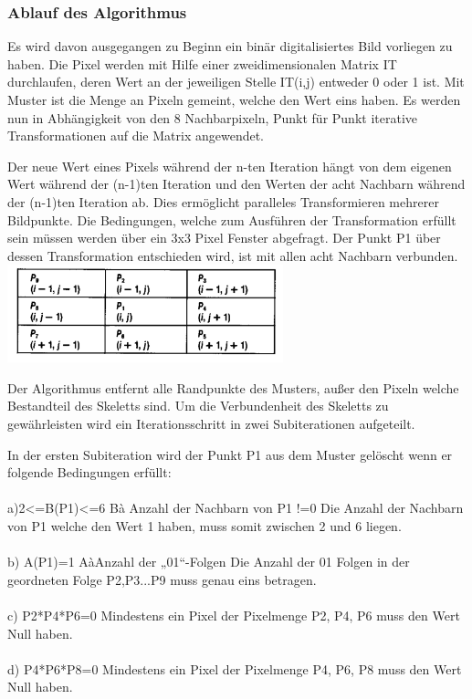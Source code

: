 \subsubsection{Ablauf des Algorithmus}

Es wird davon ausgegangen zu Beginn ein binär digitalisiertes Bild vorliegen zu haben.
Die Pixel werden mit Hilfe einer zweidimensionalen Matrix IT durchlaufen, deren Wert an der jeweiligen Stelle IT(i,j) entweder 0 oder 1 ist.
Mit Muster ist die Menge an Pixeln gemeint, welche den Wert eins haben.
Es werden nun in Abhängigkeit von den 8 Nachbarpixeln, Punkt für Punkt iterative Transformationen auf die Matrix angewendet.

Der neue Wert eines Pixels während der n-ten Iteration hängt von dem eigenen Wert während der (n-1)ten Iteration und den Werten der acht Nachbarn während der (n-1)ten Iteration ab. Dies ermöglicht paralleles Transformieren mehrerer Bildpunkte. 
Die Bedingungen, welche zum Ausführen der Transformation erfüllt sein müssen werden über ein 3x3 Pixel Fenster abgefragt. Der Punkt P1 über dessen Transformation entschieden wird, ist mit allen acht Nachbarn verbunden.\\

\includegraphics[width=8cm]{Res/PixelNachbarschaft.png}


Der Algorithmus entfernt alle Randpunkte des Musters, außer den Pixeln welche Bestandteil des Skeletts sind. Um die Verbundenheit des Skeletts zu gewährleisten wird ein  Iterationsschritt in zwei Subiterationen aufgeteilt.

In der ersten Subiteration wird der Punkt P1 aus dem Muster gelöscht wenn er folgende Bedingungen erfüllt:\\ \\
a)2<=B(P1)<=6     
Bà Anzahl der Nachbarn von P1 !=0
Die Anzahl der Nachbarn von P1 welche den Wert 1 haben, muss somit zwischen 2 und 6 liegen.\\ \\
b) A(P1)=1
AàAnzahl der „01“-Folgen 
Die Anzahl der 01 Folgen in der geordneten Folge P2,P3...P9 muss genau eins betragen.\\ \\
c) P2*P4*P6=0  
Mindestens ein Pixel der Pixelmenge P2, P4, P6 muss den Wert Null haben.\\ \\
d) P4*P6*P8=0
Mindestens ein Pixel der Pixelmenge P4, P6, P8 muss den Wert Null haben.
\\

